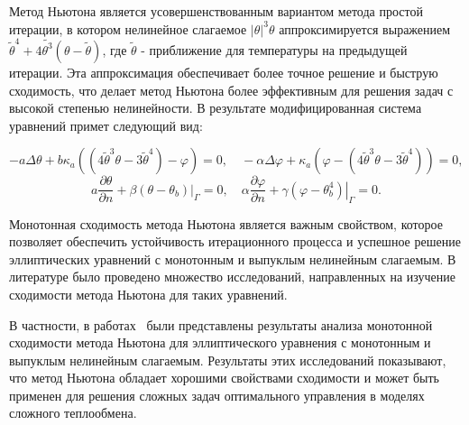 Метод Ньютона является усовершенствованным вариантом метода простой итерации,
в котором нелинейное слагаемое $|\theta|^3 \theta$ аппроксимируется
выражением $\widetilde{\theta}^4+4 \widetilde{\theta^3}(\theta-\widetilde{\theta})$,
где $\widetilde{\theta}$ - приближение для температуры на предыдущей итерации.
Эта аппроксимация обеспечивает более точное решение и быструю сходимость,
что делает метод Ньютона более эффективным для
решения задач с высокой степенью нелинейности.
В результате модифицированная система уравнений примет следующий вид:

\begin{equation}
    \tag{L1}
    \label{eq:L1}
        -a \Delta \theta+b \kappa_{a}\left(\left(4 \widetilde{\theta}^{3}
        \theta-3 \widetilde{\theta}^{4}\right)-\varphi\right)=0,
        \quad-\alpha \Delta \varphi
        +\kappa_{a}\left(\varphi
        -\left(4 \widetilde{\theta}^{3}
        \theta-3 \widetilde{\theta}^{4}\right)\right)=0,
\end{equation}
\begin{equation}
     \tag{L2}
    \label{eq:L2}
        a \frac{\partial \theta}{\partial n}
        +\left.\beta\left(\theta-\theta_{b}\right)\right|_{\Gamma}=0,
        \quad \alpha \frac{\partial \varphi}{\partial n}
        +\left.\gamma\left(\varphi-\theta_{b}^{4}\right)\right|_{\Gamma}=0.
\end{equation}

Монотонная сходимость метода Ньютона является важным свойством,
которое позволяет обеспечить устойчивость итерационного процесса
и успешное решение эллиптических уравнений
с монотонным и выпуклым нелинейным слагаемым.
В литературе было проведено множество исследований, направленных
на изучение сходимости метода Ньютона для таких уравнений.

В частности, в работах~\cite{Mukhamadiev1971, Schryer1971} были представлены
результаты анализа монотонной сходимости метода Ньютона для эллиптического
уравнения с монотонным и выпуклым нелинейным слагаемым.
Результаты этих исследований показывают, что метод Ньютона обладает
хорошими свойствами сходимости и может быть применен для решения
сложных задач оптимального управления в моделях сложного теплообмена.

